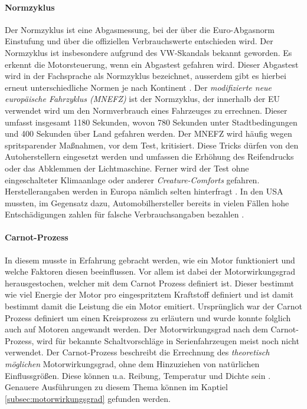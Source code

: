 \paragraph{Normzyklus}
Der Normzyklus ist eine Abgasmessung, bei der über die Euro-Abgasnorm Einstufung und über die offiziellen Verbrauchswerte  entschieden wird.
Der Normzyklus ist insbesondere aufgrund des VW-Skandals \cite{SIMR.CH1-fahrstil-analyse.VWSkandal} bekannt geworden. Es erkennt die Motorsteuerung, wenn ein Abgastest gefahren wird. Dieser Abgastest wird in der Fachsprache als Normzyklus bezeichnet, ausserdem gibt es hierbei erneut unterschiedliche Normen je nach Kontinent \cite{SIMR.CH1-fahrstil-analyse.Normzyklus}. Der \textit{modifizierte neue europäische Fahrzyklus (MNEFZ)} ist der Normzyklus, der innerhalb der EU verwendet wird um den Normverbrauch eines Fahrzeuges zu errechnen. Dieser umfasst insgesamt 1180 Sekunden, wovon 780 Sekunden unter Stadtbedingungen und 400 Sekunden über Land gefahren werden. Der MNEFZ wird häufig wegen spritsparender Maßnahmen, vor dem Test, kritisiert. Diese Tricks dürfen von den Autoherstellern eingesetzt werden und umfassen die Erhöhung des Reifendrucks oder das Abklemmen der Lichtmaschine. Ferner wird der Test ohne eingeschalteter Klimaanlage oder anderer \textit{Creature-Comforts} gefahren. Herstellerangaben werden in Europa nämlich selten hinterfragt \cite{SIMR.CH1-fahrstil-analyse.MNEFZ}. In den USA mussten, im Gegensatz dazu, Automobilhersteller bereits in vielen Fällen hohe Entschädigungen zahlen für falsche Verbrauchsangaben bezahlen \cite{SIMR.CH1-fahrstil-analyse.falscherVerbrauchUS}.
\paragraph{Carnot-Prozess}
In diesem musste in Erfahrung gebracht werden, wie ein Motor funktioniert und welche Faktoren diesen beeinflussen. Vor allem ist dabei der Motorwirkungsgrad herausgestochen, welcher mit dem Carnot Prozess definiert ist. Dieser bestimmt wie viel Energie der Motor pro eingespritztem Kraftstoff definiert und ist damit bestimmt damit die Leistung die ein Motor emitiert. Ursprünglich war der Carnot Prozess definiert um einen Kreisprozess zu erläutern und wurde konnte folglich auch auf Motoren angewandt werden.
Der Motorwirkungsgrad nach dem Carnot-Prozess, wird für bekannte Schaltvorschläge in Serienfahrzeugen meist noch nicht verwendet. Der Carnot-Prozess beschreibt die Errechnung des \textit{theoretisch möglichen} Motorwirkungsgrad, ohne dem Hinzuziehen von natürlichen Einflussgrößen. Diese können u.a. Reibung, Temperatur und Dichte sein \cite{SIMR.CH1-Fahrstil-Analyse.CarnotWirkungsgrad}. Genauere Ausführungen zu diesem Thema können im Kaptiel \ref{subsec:motorwirkungsgrad} gefunden werden. 
